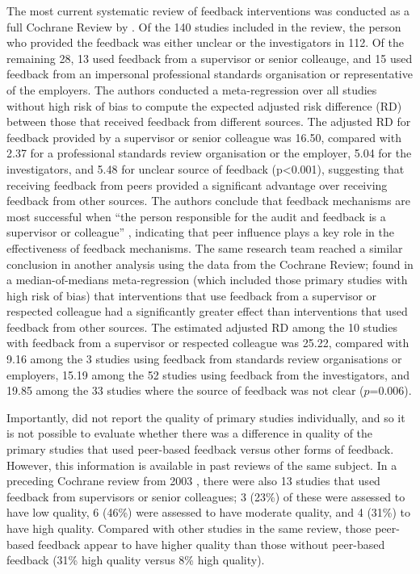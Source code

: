 \documentclass[12pt]{article}
\begin{document}
The most current systematic review of feedback interventions was conducted as a full Cochrane Review by \citet{iversAuditFeedbackEffects2012}. Of the 140 studies included in the review, the person who provided the feedback was either unclear or the investigators in 112. Of the remaining 28, 13 used feedback from a supervisor or senior colleauge, and 15 used feedback from an impersonal professional standards organisation or representative of the employers. The authors conducted a meta-regression over all studies without high risk of bias to compute the expected adjusted risk difference (RD) between those that received feedback from different sources. The adjusted RD for feedback provided by a supervisor or senior colleague was 16.50, compared with 2.37 for a professional standards review organisation or the employer, 5.04 for the investigators, and 5.48 for unclear source of feedback (p<0.001), suggesting that receiving feedback from peers provided a significant advantage over receiving feedback from other sources. The authors conclude that feedback mechanisms are most successful when ``the person responsible for the audit and feedback is a supervisor or colleague'' \citep{iversAuditFeedbackEffects2012}, indicating that peer influence plays a key role in the effectiveness of feedback mechanisms. The same research team reached a similar conclusion in another analysis using the data from the Cochrane Review; \citet{iversGrowingLiteratureStagnant2014} found in a median-of-medians meta-regression (which included those primary studies with high risk of bias) that interventions that use feedback from a supervisor or respected colleague had a significantly greater effect than interventions that used feedback from other sources. The estimated adjusted RD among the 10 studies with feedback from a supervisor or respected colleague was 25.22, compared with 9.16 among the 3 studies using feedback from standards review organisations or employers, 15.19 among the 52 studies using feedback from the investigators, and 19.85 among the 33 studies where the source of feedback was not clear ($p$=0.006).

Importantly, \citet{iversAuditFeedbackEffects2012} did not report the quality of primary studies individually, and so it is not possible to evaluate whether there was a difference in quality of the primary studies that used peer-based feedback versus other forms of feedback.
However, this information is available in past reviews of the same subject. In a preceding Cochrane review from 2003 \citep{jamtvedtAuditFeedbackEffects2003a}, there were also 13 studies that used feedback from supervisors or senior colleagues; 3 (23\%) of these were assessed to have low quality, 6 (46\%) were assessed to have moderate quality, and 4 (31\%) to have high quality. Compared with other studies in the same review, those peer-based feedback appear to have higher quality than those without peer-based feedback (31\% high quality versus 8\% high quality).
\end{document}
